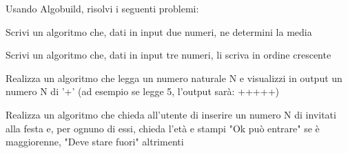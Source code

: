 \documentclass[addpoints]{exam}
\begin{document}
 
 
\vspace{5mm}
 
 
\vspace{5mm}
 
 
\vspace{10mm}
 Usando Algobuild, risolvi i seguenti problemi:
\begin{questions}

\question[2] Scrivi un algoritmo che, dati in input due numeri, ne determini la media

\question[2] Scrivi un algoritmo che, dati in input tre numeri, li scriva in ordine crescente

\question[3] Realizza un algoritmo che legga un numero naturale N e visualizzi in output un numero N di '+' (ad esempio se legge 5, l'output sarà: +++++)

\question[3] Realizza un algoritmo che chieda all'utente di inserire un numero N di invitati alla festa e, per ognuno di essi, chieda l'età e stampi "Ok può entrare" se è maggiorenne, "Deve stare fuori" altrimenti

\end{questions}

\begin{center}
	\gradetable[h][questions]
\end{center}
\end{document}
